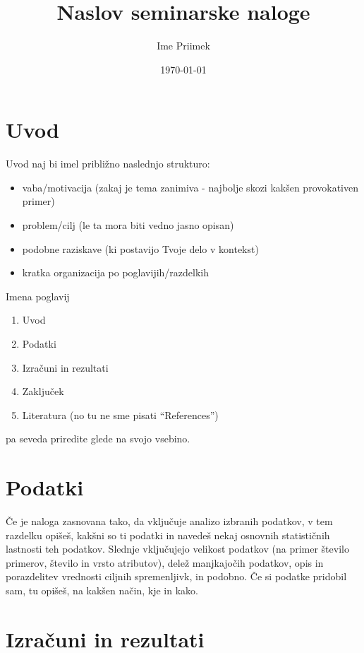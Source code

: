 \documentclass[a4paper,11pt]{article}
\title{Naslov seminarske naloge}
\author{Ime Priimek} %
\date{\today}
\begin{document}
\maketitle

\section{Uvod}


Uvod naj bi imel približno naslednjo strukturo:
\begin{itemize}
      \item vaba/motivacija (zakaj je tema zanimiva - najbolje skozi
            kakšen provokativen primer)
      \item problem/cilj (le ta mora biti vedno jasno opisan)
      \item podobne raziskave (ki postavijo Tvoje delo v kontekst)
      \item kratka organizacija po poglavijih/razdelkih
\end{itemize}
%
Imena poglavij
\begin{enumerate}
      \item Uvod
      \item Podatki
      \item Izračuni in rezultati
      \item Zaključek
      \item Literatura (no tu ne sme pisati ``References'')
\end{enumerate}
pa seveda priredite glede na svojo vsebino.


\section{Podatki}

Če je naloga zasnovana tako, da vključuje analizo izbranih podatkov, v
tem razdelku opišeš, kakšni so ti podatki in navedeš nekaj osnovnih
statističnih lastnosti teh podatkov. Slednje vključujejo velikost
podatkov (na primer število primerov, število in vrsto atributov), delež
manjkajočih podatkov, opis in porazdelitev vrednosti ciljnih
spremenljivk, in podobno. Če si podatke pridobil sam, tu opišeš, na
kakšen način, kje in kako.

\section{Izračuni in rezultati}
\end{document}
